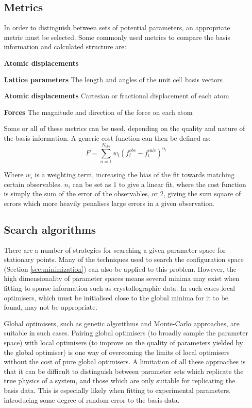 \subsection{Metrics}
In order to distinguish between sets of potential parameters, an appropriate metric must be selected.
Some commonly used metrics to compare the basis information and calculated structure are:
\begin{labeling}{\textbf{Atomic displacements}}
	\item [\textbf{Lattice parameters}] The length and angles of the unit cell basis vectors
	\item [\textbf{Atomic displacements}] Cartesian or fractional displacement of each atom
	\item [\textbf{Forces}] The magnitude and direction of the force on each atom
\end{labeling}
Some or all of these metrics can be used, depending on the quality and nature of the basis information.
A generic cost function can then be defined as:
\begin{equation}
	F = \sum_{n=1}^{N_{obs}}w_i(f_i^{obs} - f_i^{calc})^{n_i}
\end{equation}

Where $w_i$ is a weighting term, increasing the bias of the fit towards matching certain observables.
$n_i$ can be set as 1 to give a linear fit, where the cost function is simply the sum of the error of the observables, or 2, giving the sum square of errors which more heavily penalises large errors in a given observation.

\subsection{Search algorithms} %
There are a number of strategies for searching a given parameter space for stationary points.
Many of the techniques used to search the configuration space (Section \ref{sec:minimization}) can also be applied to this problem.
However, the high dimensionality of parameter spaces means several minima may exist when fitting to sparse information such as crystallographic data.
In such cases local optimisers, which must be initialised close to the global minima for it to be found, may not be appropriate.

Global optimisers, such as genetic algorithms and Monte-Carlo approaches, are suitable in such cases.
Pairing global optimisers (to broadly sample the parameter space) with local optimisers (to improve on the quality of parameters yielded by the global optimiser) is one way of overcoming the limits of local optimisers without the cost of pure global optimisers.
A limitation of all these approaches is that it can be difficult to distinguish between parameter sets which replicate the true physics of a system, and those which are only suitable for replicating the basis data.
This is especially likely when fitting to experimental parameters, introducing some degree of random error to the basis data.

